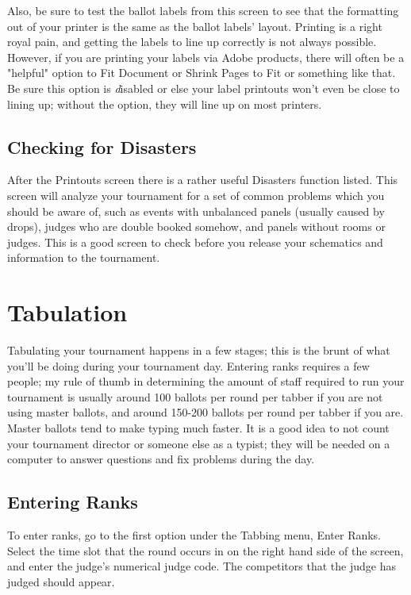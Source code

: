 \documentclass[12pt]{report} \usepackage {fullpage} \usepackage{times}
\begin{document}
Also, be sure to test the ballot labels from this screen to see that the
formatting out of your printer is the same as the ballot labels' layout.
Printing is a right royal pain, and getting the labels to line up correctly
is not always possible.  However, if you are printing your labels via Adobe
products, there will often be a "helpful" option to Fit Document or Shrink
Pages to Fit or something like that.   Be sure this option is {\emph
disabled} or else your label printouts won't even be close to lining up;
without the option, they will line up on most printers.

\section{Checking for Disasters}

After the Printouts screen there is a rather useful Disasters function
listed.   This screen will analyze your tournament for a set of common
problems which you should be aware of, such as events with unbalanced
panels (usually caused by drops), judges who are double booked somehow, and
panels without rooms or judges.  This is a good screen to check before you
release your schematics and information to the tournament.     

\chapter{Tabulation}

Tabulating your tournament happens in a few stages; this is the brunt of
what you'll be doing during your tournament day.  Entering ranks requires a
few people; my rule of thumb in determining the amount of staff required to
run your tournament is usually around 100 ballots per round per tabber if
you are not using  master ballots, and around 150-200 ballots per round per
tabber if you are.  Master ballots tend to make typing much faster.  It is
a good idea to not count your tournament director or someone else as a
typist;  they will be needed on a computer to answer questions and fix
problems during the day. 

\section{Entering Ranks}

To enter ranks, go to the first option under the Tabbing menu, Enter Ranks.
Select the time slot that the round occurs in on the right hand side of the
screen, and enter the judge's numerical judge code.   The competitors that
the judge has judged should appear. 
\end{document}
